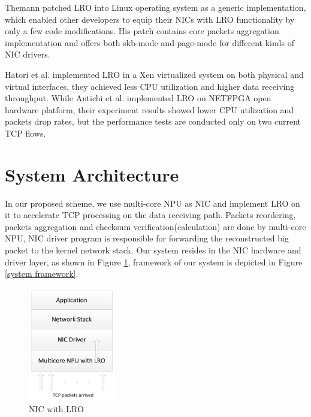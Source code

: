 \documentclass[conference]{IEEEtran}
\begin{document}
Themann\cite{theman2007lro} patched LRO into Linux operating system as a generic implementation, which enabled other developers to equip their NICs with LRO functionality by only a few code modifications. His patch contains core packets aggregation implementation and offers both skb-mode and page-mode for different kinds of NIC drivers.

Hatori\cite{hatori2008implementation} et al. implemented LRO in a Xen virtualized system on both physical and virtual interfaces, they achieved less CPU utilization and higher data receiving throughput. While Antichi\cite{antichi2013implementation} et al. implemented LRO on NETFPGA open hardware platform, their experiment results showed lower CPU utilization and packets drop rates, but the performance tests are conducted only on two current TCP flows.
\section{System Architecture}
In our proposed scheme, we use multi-core NPU as NIC and implement LRO on it to accelerate TCP processing on the data receiving path. Packets reordering, packets aggregation and checksum verification(calculation) are done by multi-core NPU, NIC driver program is responsible for forwarding the reconstructed big packet to the kernel network stack. Our system resides in the NIC hardware and driver layer, as shown in Figure \ref{nic_with_lro}, framework of our system is depicted in Figure \ref{system framework}.
\begin{figure}[!t]
\centering
\includegraphics[width=1.5in]{nic_with_lro}
\caption{NIC with LRO}
\label{nic_with_lro}
\end{figure}
\end{document}
